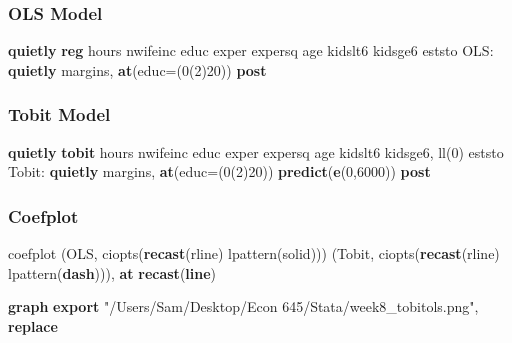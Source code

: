 \documentclass[
]{book}
\newenvironment{Shaded}{\begin{snugshade}}{\end{snugshade}}
\newcommand{\FunctionTok}[1]{\textcolor[rgb]{0.13,0.29,0.53}{\textbf{#1}}}
\newcommand{\KeywordTok}[1]{\textcolor[rgb]{0.13,0.29,0.53}{\textbf{#1}}}
\newcommand{\NormalTok}[1]{#1}
\newcommand{\StringTok}[1]{\textcolor[rgb]{0.31,0.60,0.02}{#1}}
\begin{document}
\subsubsection*{OLS Model}\label{ols-model-1}

\begin{Shaded}
\begin{Highlighting}[]
\KeywordTok{quietly} \KeywordTok{reg}\NormalTok{ hours nwifeinc educ exper expersq age kidslt6 kidsge6}
\NormalTok{eststo OLS: }\KeywordTok{quietly}\NormalTok{ margins, }\FunctionTok{at}\NormalTok{(educ=(0(2)20)) }\KeywordTok{post}
\end{Highlighting}
\end{Shaded}

\subsubsection*{Tobit Model}\label{tobit-model-1}

\begin{Shaded}
\begin{Highlighting}[]
\KeywordTok{quietly} \KeywordTok{tobit}\NormalTok{ hours nwifeinc educ exper expersq age kidslt6 kidsge6, ll(0)}
\NormalTok{eststo Tobit: }\KeywordTok{quietly}\NormalTok{ margins, }\FunctionTok{at}\NormalTok{(educ=(0(2)20)) }\KeywordTok{predict}\NormalTok{(}\FunctionTok{e}\NormalTok{(0,6000)) }\KeywordTok{post}
\end{Highlighting}
\end{Shaded}

\subsubsection*{Coefplot}\label{coefplot}

\begin{Shaded}
\begin{Highlighting}[]
\NormalTok{coefplot (OLS, ciopts(}\KeywordTok{recast}\NormalTok{(rline) lpattern(solid))) (Tobit, ciopts(}\KeywordTok{recast}\NormalTok{(rline) lpattern(}\KeywordTok{dash}\NormalTok{))), }\FunctionTok{at} \KeywordTok{recast}\NormalTok{(}\KeywordTok{line}\NormalTok{)}

\KeywordTok{graph} \KeywordTok{export} \StringTok{"/Users/Sam/Desktop/Econ 645/Stata/week8\_tobitols.png"}\NormalTok{, }\KeywordTok{replace}
\end{Highlighting}
\end{Shaded}
\end{document}
